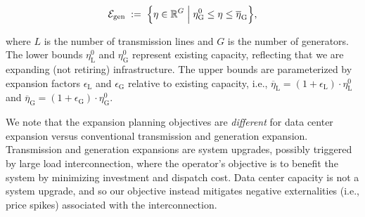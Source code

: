 \begin{equation}
\begin{aligned}
\mathcal{E}_{\text{gen}}
\;:=\;
\Bigl\{
\eta \in \mathbb{R}^{G}
\;\Big|\;
\eta^{0}_{\text{G}} \le \eta \le \overline{\eta}_{\text{G}}
\Bigr\},
\end{aligned}
\end{equation}

where $L$ is the number of transmission lines and $G$ is the number of generators. The lower bounds $\eta^{0}_{\text{L}}$ and $\eta^{0}_{\text{G}}$ represent existing capacity, reflecting that we are expanding (not retiring) infrastructure. The upper bounds are parameterized by expansion factors $\epsilon_{\text{L}}$ and $\epsilon_{\text{G}}$ relative to existing capacity, i.e., $\overline{\eta}_{\text{L}} = (1 + \epsilon_{\text{L}}) \cdot \eta^{0}_{\text{L}}$ and $\overline{\eta}_{\text{G}} = (1 + \epsilon_{\text{G}}) \cdot \eta^{0}_{\text{G}}$.

We note that the expansion planning objectives are \emph{different} for data center expansion versus conventional transmission and generation expansion. Transmission and generation expansions are system upgrades, possibly triggered by large load interconnection, where the operator's objective is to benefit the system by minimizing investment and dispatch cost. Data center capacity is not a system upgrade, and so our objective instead mitigates negative externalities (i.e., price spikes) associated with the interconnection.
